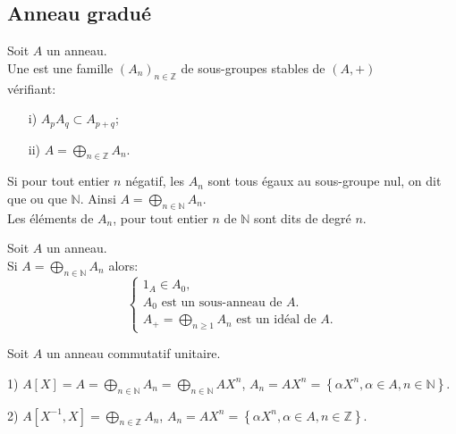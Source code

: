 \subsection{Anneau gradué}
\begin{madefinition}
	Soit $A$ un anneau.\\
	Une  est une famille $(A_n)_{n \in \mathbb{Z}}$ de  sous-groupes stables de $(A,+)$ \\vérifiant:
	\begin{enumerate}
		\item[i)] $ A_p A_q \subset A_{p+q} $;
		\item[ii)] $ A =\displaystyle \bigoplus_{n \in \mathbb{Z}}{A_n} $.
	\end{enumerate}
	Si pour tout  entier $n$ négatif, les $A_n$ sont tous égaux au sous-groupe nul, on dit que  ou que  $\mathbb{N}$. Ainsi $ A =\displaystyle \bigoplus_{n \in \mathbb{N}}{A_n} $.\\ Les éléments de $A_n$, pour tout entier $n$ de $ \mathbb{N} $ sont dits de degré $n$.
\end{madefinition} 
\begin{maremarque}
	Soit $A$ un anneau.\\
	Si $ A =\displaystyle \bigoplus_{n \in \mathbb{N}}{A_n} $ alors:
	$$  
	\begin{cases}
		1_A \in A_0,\\
		A_0 \text{ est un sous-anneau de }A. \\
		 A_{+} =\displaystyle \bigoplus_{n \geqslant 1}{A_n} \text{ est un idéal de }A.
	\end{cases}
	$$
	\begin{monexemple}
		Soit $A$ un anneau commutatif unitaire.
		\item[1)] $A[X] =  A =\displaystyle \bigoplus_{n \in \mathbb{N}}{A_n} =\displaystyle \bigoplus_{n \in \mathbb{N}}{A}X^n $, $A_n=AX^n = \left\{\alpha X^n, \alpha \in A, n \in \mathbb{N} \right\}$.
		\item[2)] $ A[X^{-1}, X] = \displaystyle \bigoplus_{n \in \mathbb{Z}}{A_n}$, $A_n=AX^n=\left\{\alpha X^n, \alpha \in A, n \in \mathbb{Z} \right\}$.
	\end{monexemple}
\end{maremarque}
